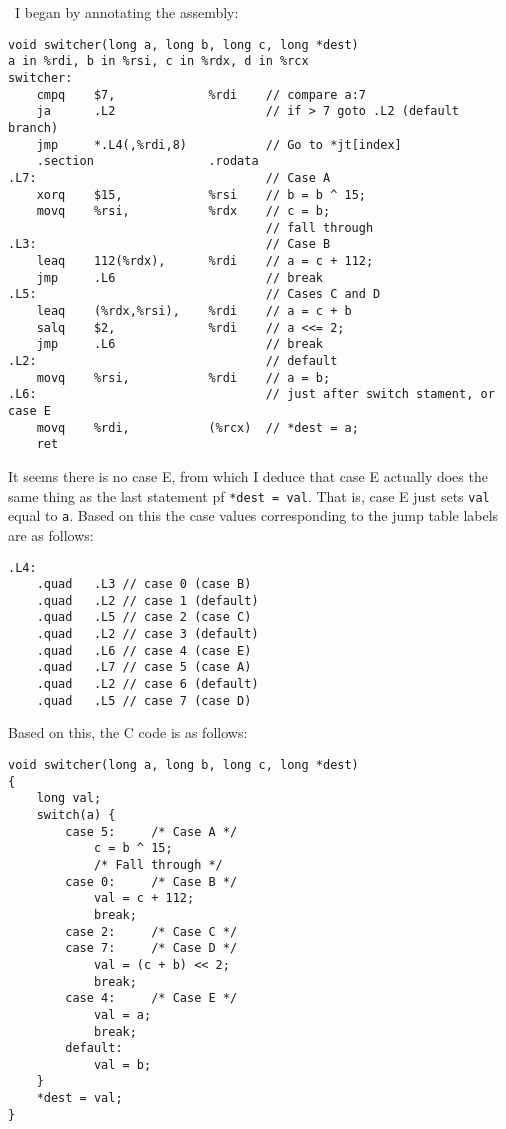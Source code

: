 \documentclass[12pt]{article}
\newenvironment{sol}[1][Solution]{\begin{trivlist}
		\item[\hskip \labelsep {\bfseries #1:}]}{\end{trivlist}}
\begin{document}
{\begin{sol}
	\
	I began by annotating the assembly:
		\begin{lstlisting}[language={}]
void switcher(long a, long b, long c, long *dest)
a in %rdi, b in %rsi, c in %rdx, d in %rcx
switcher:
	cmpq	$7,				%rdi	// compare a:7
	ja		.L2						// if > 7 goto .L2 (default branch)
	jmp		*.L4(,%rdi,8)			// Go to *jt[index]
	.section				.rodata
.L7:								// Case A
	xorq	$15,			%rsi	// b = b ^ 15;
	movq	%rsi,			%rdx	// c = b;
									// fall through
.L3:								// Case B
	leaq	112(%rdx),		%rdi	// a = c + 112;
	jmp		.L6						// break
.L5:								// Cases C and D
	leaq	(%rdx,%rsi),	%rdi	// a = c + b
	salq	$2,				%rdi	// a <<= 2;
	jmp		.L6						// break
.L2:								// default
	movq	%rsi,			%rdi	// a = b;
.L6:								// just after switch stament, or case E
	movq	%rdi,			(%rcx)	// *dest = a;
	ret
		\end{lstlisting}
		It seems there is no case E, from which I deduce that case E actually does
		the same thing as the last statement pf \texttt{*dest = val}. That is,
		case E just sets \texttt{val} equal to \texttt{a}. Based on this the
		case values corresponding to the jump table labels are as follows:
		\begin{lstlisting}[language={}]
.L4:
	.quad	.L3	// case 0 (case B)
	.quad	.L2	// case 1 (default)
	.quad	.L5	// case 2 (case C)
	.quad	.L2 // case 3 (default)
	.quad	.L6 // case 4 (case E)
	.quad	.L7 // case 5 (case A)
	.quad	.L2 // case 6 (default)
	.quad	.L5 // case 7 (case D)
		\end{lstlisting}
		Based on this, the C code is as follows:
	\begin{lstlisting}
void switcher(long a, long b, long c, long *dest)
{
	long val;
	switch(a) {
		case 5:		/* Case A */
			c = b ^ 15;
			/* Fall through */
		case 0:		/* Case B */
			val = c + 112;
			break;
		case 2:		/* Case C */
		case 7:		/* Case D */
			val = (c + b) << 2;
			break;
		case 4:		/* Case E */
			val = a;
			break;
		default:
			val = b;
	}
	*dest = val;
}
	\end{lstlisting}
\end{sol}
\end{document}
